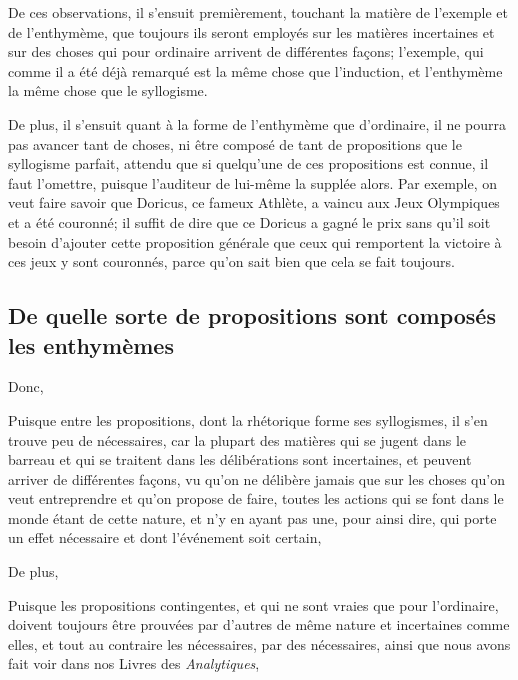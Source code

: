 \bigbreak

De ces observations, il s'ensuit premièrement, touchant la matière de l'exemple et de l'enthymème, que toujours ils seront employés sur les matières
incertaines et sur des choses qui pour ordinaire arrivent de différentes façons; l'exemple, qui comme il a été déjà remarqué est la même chose
que l'induction, et l'enthymème la même chose que le syllogisme.

De plus, il s'ensuit quant à la forme de l'enthymème que d'ordinaire, il ne pourra pas avancer tant de choses, ni être composé de tant de propositions
que le syllogisme parfait, attendu que si quelqu'une de ces propositions est connue, il faut l'omettre, puisque l'auditeur de lui-même la supplée alors.
Par exemple, on veut faire savoir que Doricus, ce fameux Athlète, a vaincu aux Jeux Olympiques et a été couronné; il suffit de dire que ce Doricus a
gagné le prix sans qu'il soit besoin d'ajouter cette proposition générale que ceux qui remportent la victoire à ces jeux y sont couronnés, parce qu'on
sait bien que cela se fait toujours. 

\subsection{De quelle sorte de propositions sont composés les enthymèmes}

Donc,

\begin{emphpar}
	Puisque entre les propositions, dont la rhétorique forme ses syllogismes, il s'en trouve peu de nécessaires, car la plupart des matières
	qui se jugent dans le barreau et qui se traitent dans les délibérations sont incertaines, et peuvent arriver de différentes façons, vu
	qu'on ne délibère jamais que sur les choses qu'on veut entreprendre et qu'on propose de faire, toutes les actions qui se font dans le
	monde étant de cette nature, et n'y en ayant pas une, pour ainsi dire, qui porte un effet nécessaire et dont l'événement soit certain,
\end{emphpar}

De plus,

\begin{emphpar}
	Puisque les propositions contingentes, et qui ne sont vraies que pour l'ordinaire, doivent toujours être prouvées par d'autres de même nature
	et incertaines comme elles, et tout au contraire les nécessaires, par des nécessaires, ainsi que nous avons fait voir dans nos Livres des
	\emph{Analytiques},
\end{emphpar}

